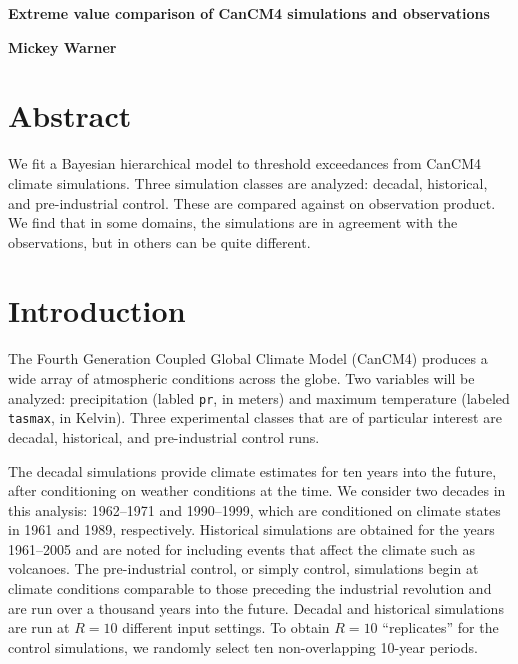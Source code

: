 \documentclass[12pt]{article}
\begin{document}
\begin{Large}
\noindent \textbf{Extreme value comparison of CanCM4 simulations and observations}
\end{Large}
\bigskip

\noindent \textbf{Mickey Warner}


\section{Abstract}
\label{abstract}
We fit a Bayesian hierarchical model to threshold exceedances from CanCM4 climate simulations. Three simulation classes are analyzed: decadal, historical, and pre-industrial control. These are compared against on observation product. We find that in some domains, the simulations are in agreement with the observations, but in others can be quite different.

\section{Introduction}
\label{intro}

The Fourth Generation Coupled Global Climate Model (CanCM4) produces a wide array of atmospheric conditions across the globe. Two variables will be analyzed: precipitation (labled \texttt{pr}, in meters) and maximum temperature (labeled \texttt{tasmax}, in Kelvin). Three experimental classes that are of particular interest are decadal, historical, and pre-industrial control runs.

The decadal simulations provide climate estimates for ten years into the future, after conditioning on weather conditions at the time. We consider two decades in this analysis: 1962--1971 and 1990--1999, which are conditioned on climate states in 1961 and 1989, respectively. Historical simulations are obtained for the years 1961--2005 and are noted for including events that affect the climate such as volcanoes. The pre-industrial control, or simply control, simulations begin at climate conditions comparable to those preceding the industrial revolution and are run over a thousand years into the future. Decadal and historical simulations are run at $R=10$ different input settings. To obtain $R=10$ ``replicates'' for the control simulations, we randomly select ten non-overlapping 10-year periods.

\end{document}
